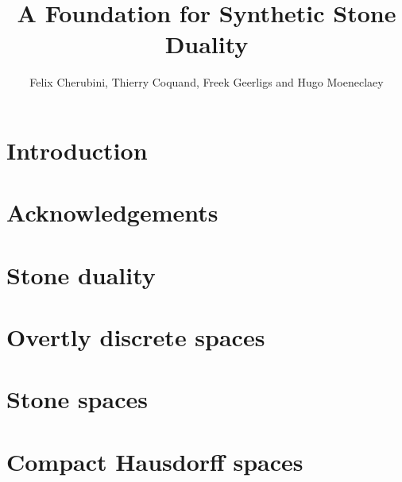 \documentclass{../util/zariski}
\title{A Foundation for Synthetic Stone Duality}
\begin{document}
\author{Felix Cherubini, Thierry Coquand, Freek Geerligs and Hugo Moeneclaey}

\maketitle

\begin{abstract}
  
\end{abstract}


\tableofcontents

\section*{Introduction}


\section*{Acknowledgements}


\section{Stone duality}







\section{Overtly discrete spaces}




\section{Stone spaces}



\section{Compact Hausdorff spaces}



\end{document}
